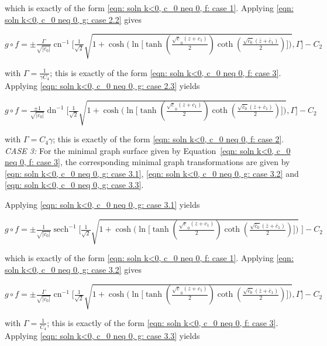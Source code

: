 \documentclass[12pt]{article}
\theoremstyle{plain}
\theoremstyle{definition}
\theoremstyle{remark}
\begin{document}
  \noindent
  which is exactly of the form \ref{eqn: soln k<0, c_0 neq 0, f: case 1}.  Applying \ref{eqn: soln k<0, c_0 neq 0, g: case 2.2} gives  
  
  \(
  g\circ f=\pm\tfrac{\Gamma}{\sqrt{|c_0|}}\operatorname{cn}^{-1}\!\Big[\tfrac{1}{\sqrt{2}}\sqrt{1 + \cosh\!\big(\ln\!\big[\tanh(\tfrac{\sqrt c_0(z+c_1)}{2})\coth(\tfrac{\sqrt{\bar c_0}(\bar z+\bar c_1)}{2})\big]\big)},\Gamma\Big]-C_2 
  \)  
  
  \noindent
  with \(\Gamma=\tfrac{1}{\gamma C_4}\); this is exactly of the form \ref{eqn: soln k<0, c_0 neq 0, f: case 3}.  Applying \ref{eqn: soln k<0, c_0 neq 0, g: case 2.3} yields  
  
  \(
  g\circ f=\tfrac{\pm1}{\sqrt{|c_0|}}\operatorname{dn}^{-1}\!\Big[\tfrac{1}{\sqrt{2}}\sqrt{1 + \cosh\!\big(\ln\!\big[\tanh(\tfrac{\sqrt c_0(z+c_1)}{2})\coth(\tfrac{\sqrt{\bar c_0}(\bar z+\bar c_1)}{2})\big]\big)},\Gamma\Big]-C_2
  \) 
  
  \noindent
  with \(\Gamma=C_4\gamma\); this is exactly of the form \ref{eqn: soln k<0, c_0 neq 0, f: case 2}.  \\
  
  \textit{CASE 3:} For the minimal graph surface given by Equation~\ref{eqn: soln k<0, c_0 neq 0, f: case 3}, the corresponding minimal graph transformations are given by \ref{eqn: soln k<0, c_0 neq 0, g: case 3.1}, \ref{eqn: soln k<0, c_0 neq 0, g: case 3.2} and \ref{eqn: soln k<0, c_0 neq 0, g: case 3.3}.  
  
  \noindent
  Applying \ref{eqn: soln k<0, c_0 neq 0, g: case 3.1} yields  
  
  \(
  g\circ f=\pm\tfrac{1}{\sqrt{|c_0|}}\operatorname{sech}^{-1}\!\Big[\tfrac{1}{\sqrt{2}}\sqrt{1 + \cosh\!\big(\ln\!\big[\tanh(\tfrac{\sqrt c_0(z+c_1)}{2})\coth(\tfrac{\sqrt{\bar c_0}(\bar z+\bar c_1)}{2})\big]\big)}\;\Big]-C_2 
  \)  
  
  \noindent
  which is exactly of the form \ref{eqn: soln k<0, c_0 neq 0, f: case 1}.   Applying \ref{eqn: soln k<0, c_0 neq 0, g: case 3.2} gives  
  
  \(
  g\circ f=\pm\tfrac{\Gamma}{\sqrt{|c_0|}}\operatorname{cn}^{-1}\!\Big[\tfrac{1}{\sqrt{2}}\sqrt{1 + \cosh\!\big(\ln\!\big[\tanh(\tfrac{\sqrt c_0(z+c_1)}{2})\coth(\tfrac{\sqrt{\bar c_0}(\bar z+\bar c_1)}{2})\big]\big)},\Gamma\Big]-C_2 
  \)
  
  \noindent
  with \(\Gamma=\tfrac{1}{C_4}\); this is exactly of the form \ref{eqn: soln k<0, c_0 neq 0, f: case 3}.   Applying \ref{eqn: soln k<0, c_0 neq 0, g: case 3.3} yields  
  
\end{document}
